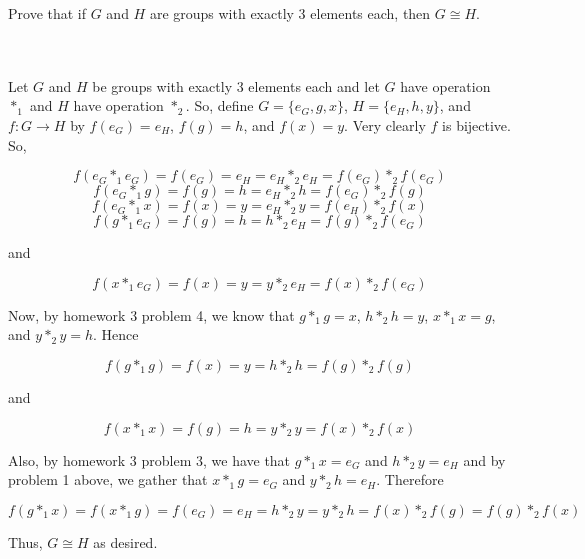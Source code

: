 Prove that if $G$ and $H$ are groups with exactly 3 elements each, then $G\cong H$.\\\\

\begin{solution}\renewcommand{\qedsymbol}{}\ \\
    Let $G$ and $H$ be groups with exactly 3 elements each and let $G$ have operation $*_1$ and $H$ have
    operation $*_2$. So, define $G=\{e_G, g, x\}$, $H=\{e_H, h, y\}$, and $f:G\rightarrow H$ by
    $f(e_G)=e_H$, $f(g)=h$, and $f(x)=y$. Very clearly $f$ is bijective. So,
    
    $$f(e_G*_1e_G)=f(e_G)=e_H=e_H*_2e_H=f(e_G)*_2f(e_G)$$ 
    $$f(e_G*_1g)=f(g)=h=e_H*_2h=f(e_G)*_2f(g)$$
    $$f(e_G*_1x)=f(x)=y=e_H*_2y=f(e_H)*_2f(x)$$
    $$f(g*_1e_G)=f(g)=h=h*_2e_H=f(g)*_2f(e_G)$$
    
    and
    
    $$f(x*_1e_G)=f(x)=y=y*_2e_H=f(x)*_2f(e_G)$$
    
    Now, by homework 3 problem 4, we know that $g*_1g=x$, $h*_2h=y$, $x*_1x=g$, and $y*_2y=h$. Hence
    
    $$f(g*_1g)=f(x)=y=h*_2h=f(g)*_2f(g)$$
    
    and
    
    $$f(x*_1x)=f(g)=h=y*_2y=f(x)*_2f(x)$$
    
    Also, by homework 3 problem 3, we have that $g*_1x=e_G$ and $h*_2y=e_H$ and by problem 1 above, we
    gather that $x*_1g=e_G$ and $y*_2h=e_H$. Therefore
    
    $$f(g*_1x)=f(x*_1g)=f(e_G)=e_H=h*_2y=y*_2h=f(x)*_2f(g)=f(g)*_2f(x)$$
    
    Thus, $G\cong H$ as desired.

\end{solution}